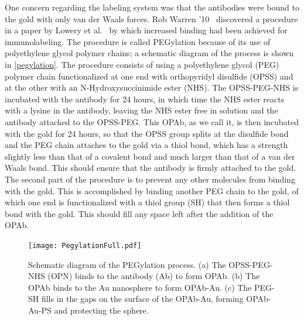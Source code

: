 One concern regarding the labeling system was that the antibodies were bound to the gold with only van der Waals forces. Rob Warren '10~\citep{warren} discovered a procedure in a paper by Lowery et al.~\citep{westpegylation} by which increased binding had been achieved for immunolabeling. The procedure is called PEGylation because of its use of polyethylene glycol polymer chains; a schematic diagram of the process is shown in \autoref{pegylation}. The procedure consists of using a polyethylene glycol (PEG) polymer chain functionalized at one end with orthopyridyl disulfide (OPSS) and at the other with an N-Hydroxysuccinimide ester (NHS). The OPSS-PEG-NHS is incubated with the antibody for 24 hours, in which time the NHS ester reacts with a lysine in the antibody, leaving the NHS ester free in solution and the antibody attached to the OPSS-PEG. This OPAb, as we call it, is then incubated with the gold for 24 hours, so that the OPSS group splits at the disulfide bond and the PEG chain attaches to the gold via a thiol bond, which has a strength slightly less than that of a covalent bond and much larger than that of a van der Waals bond. This should ensure that the antibody is firmly attached to the gold. The second part of the procedure is to prevent any other molecules from binding with the gold. This is accomplished by binding another PEG chain to the gold, of which one end is functionalized with a thiol group (SH) that then forms a thiol bond with the gold. This should fill any space left after the addition of the OPAb. 

\begin{figure}[htbp]
\centering
\texttt{[image: PegylationFull.pdf]}
\caption{Schematic diagram of the PEGylation process. (a) The OPSS-PEG-NHS (OPN) binds to the antibody (Ab) to form OPAb. (b) The OPAb binds to the Au nanosphere to form OPAb-Au. (c) The PEG-SH fills in the gaps on the surface of the OPAb-Au, forming OPAb-Au-PS and protecting the sphere.}
\label{pegylation}
\end{figure}



